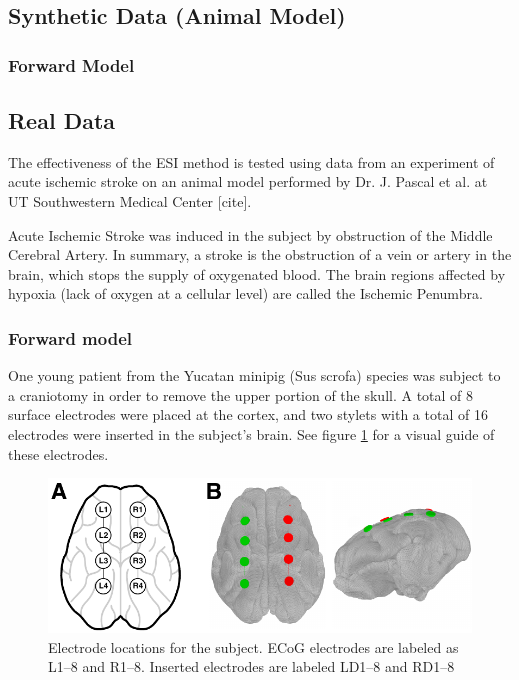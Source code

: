 \subsection{Synthetic Data (Animal Model)}

\subsubsection{Forward Model}

\subsection{Real Data}
\label{sec:real_data}

The effectiveness of the ESI method is tested using data from an experiment of acute ischemic stroke on an animal model performed by Dr. J. Pascal et al. at UT Southwestern Medical Center [cite].

Acute Ischemic Stroke was induced in the subject by obstruction of the Middle Cerebral Artery.
%
In summary, a stroke is the obstruction of a vein or artery in the brain, which stops the supply of oxygenated blood.
%
The brain regions affected by hypoxia (lack of oxygen at a cellular level) are called the Ischemic Penumbra.

\subsubsection{Forward model}

One young patient from the Yucatan minipig (Sus scrofa) species was subject to a craniotomy in order to remove the upper portion of the skull.
%
A total of 8 surface electrodes were placed at the cortex, and two stylets with a total of 16 electrodes were inserted in the subject's brain.
%
See figure \ref{fig:pig_elecs} for a visual guide of these electrodes.

\begin{figure}
\centering
\includegraphics{./img/electrodes_pig.pdf}
\caption{Electrode locations for the subject. ECoG electrodes are labeled as L1--8 and R1--8. Inserted electrodes are labeled LD1--8 and RD1--8}
\label{fig:pig_elecs}
\end{figure}

